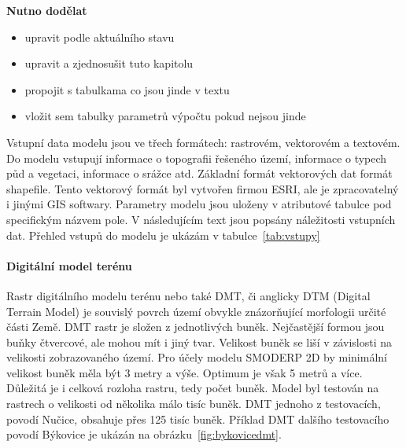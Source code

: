 
\textbf{Nutno dodělat}
\begin{itemize} \itemsep 0pt
\item upravit podle aktuálního stavu
\item upravit a zjednosušit tuto kapitolu
\item propojit s tabulkama co jsou jinde v textu
\item vložit sem tabulky parametrů výpočtu pokud nejsou jinde
\end{itemize}


Vstupní data modelu jsou ve třech formátech: rastrovém, vektorovém a textovém. Do modelu vstupují informace o topografii řešeného území, informace o typech půd a vegetaci, informace o srážce atd. Základní formát vektorových dat formát shapefile. Tento vektorový formát byl vytvořen firmou ESRI, ale je zpracovatelný i jinými GIS softwary. Parametry modelu jsou uloženy v atributové tabulce pod specifickým názvem pole. 
V následujícím text jsou popsány náležitosti vstupních dat. 
% 
Přehled vstupů do modelu je ukázám v tabulce~\ref{tab:vstupy}
% 
% 

% 

\paragraph{Digitální model terénu} \label{sec:vstupdmt} 

Rastr digitálního modelu terénu nebo také DMT, či anglicky DTM (Digital Terrain Model) je souvislý povrch území obvykle znázorňující morfologii určité části Země. DMT rastr je složen z jednotlivých buněk. Nejčastější formou jsou buňky čtvercové, ale mohou mít i jiný tvar. Velikost buněk se liší v závislosti na velikosti zobrazovaného území. Pro účely modelu SMODERP 2D by minimální velikost buněk měla být 3 metry a výše. Optimum je však 5 metrů a více. Důležitá je i celková rozloha rastru, tedy počet buněk. Model byl testován na rastrech o velikosti od několika málo tisíc buněk. DMT jednoho z testovacích, povodí Nučice, obsahuje přes 125 tisíc buněk. Příklad DMT dalšího testovacího povodí Býkovice je ukázán na obrázku~\ref{fig:bykovicedmt}.


